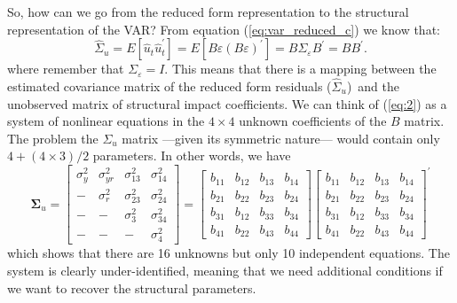 \documentclass[10pt]{article}
\begin{document}
So, how can we go from the reduced form representation to the structural
representation of the VAR? From equation (\ref{eq:var_reduced_c}) we know
that:%
\begin{equation}
\hat{\Sigma}_{u}=E\left[ \hat{u}_{t}\hat{u}_{t}^{\prime }\right] =E\left[
B\varepsilon \left( B\varepsilon \right) ^{\prime }\right] =B\Sigma
_{\varepsilon }B^{\prime }=BB^{\prime }.  \label{eq:2}
\end{equation}%
where remember that $\Sigma _{\varepsilon }=I$. This means that there is a
mapping between the estimated covariance matrix of the reduced form
residuals ($\hat{\Sigma}_{u}$)\ and the unobserved matrix of structural
impact coefficients. We can think of (\ref{eq:2}) as a system of nonlinear
equations in the $4\times 4$ unknown coefficients of the $B$ matrix. The
problem the $\Sigma _{u}$ matrix ---given its symmetric nature--- would
contain only $4+(4\times 3)/2$ parameters. In other words, we have
\begin{equation*}
\mathbf{\Sigma }_{u}=\left[
\begin{array}{cccc}
\sigma _{y}^{2} & \sigma _{yr}^{2} & \sigma _{13}^{2} & \sigma _{14}^{2} \\
- & \sigma _{r}^{2} & \sigma _{23}^{2} & \sigma _{24}^{2} \\
- & - & \sigma _{3}^{2} & \sigma _{34}^{2} \\
- & - & - & \sigma _{4}^{2}%
\end{array}%
\right] =\left[
\begin{array}{cccc}
b_{11} & b_{12} & b_{13} & b_{14} \\
b_{21} & b_{22} & b_{23} & b_{24} \\
b_{31} & b_{12} & b_{33} & b_{34} \\
b_{41} & b_{22} & b_{43} & b_{44}%
\end{array}%
\right] \left[
\begin{array}{cccc}
b_{11} & b_{12} & b_{13} & b_{14} \\
b_{21} & b_{22} & b_{23} & b_{24} \\
b_{31} & b_{12} & b_{33} & b_{34} \\
b_{41} & b_{22} & b_{43} & b_{44}%
\end{array}%
\right] ^{\prime }
\end{equation*}%
which shows that there are 16 unknowns but only 10 independent equations.
The system is clearly under-identified, meaning that we need additional
conditions if we want to recover the structural parameters.
\end{document}
